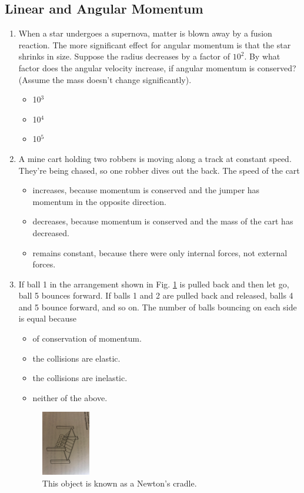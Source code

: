 \documentclass[10pt]{article}
\begin{document}
\subsection{Linear and Angular Momentum}
\begin{enumerate}
\item When a star undergoes a supernova, matter is blown away by a fusion reaction.  The more significant effect for angular momentum is that the star shrinks in size.  Suppose the radius decreases by a factor of $10^2$.  By what factor does the angular velocity increase, if angular momentum is conserved? (Assume the mass doesn't change significantly).
\begin{itemize}
\item 10$^3$
\item 10$^4$
\item 10$^5$
\end{itemize}
\item A mine cart holding two robbers is moving along a track at constant speed.  They're being chased, so one robber dives out the back.  The speed of the cart
\begin{itemize}
\item increases, because momentum is conserved and the jumper has momentum in the opposite direction.
\item decreases, because momentum is conserved and the mass of the cart has decreased.
\item remains constant, because there were only internal forces, not external forces.
\end{itemize}
\item If ball 1 in the arrangement shown in Fig. \ref{fig:newton} is pulled back and then let go, ball 5 bounces forward.  If balls 1 and 2 are pulled back and released, balls 4 and 5 bounce forward, and so on.  The number of balls bouncing on each side is equal because
\begin{itemize}
\item of conservation of momentum.
\item the collisions are elastic.
\item the collisions are inelastic.
\item neither of the above.
\end{itemize}
\begin{figure}
\centering
\includegraphics[width=0.2\textwidth,trim=20cm 5cm 15cm 20cm,clip=true]{newton.jpeg}
\caption{\label{fig:newton} This object is known as a Newton's cradle.}
\end{figure}
\end{enumerate}
\end{document}
